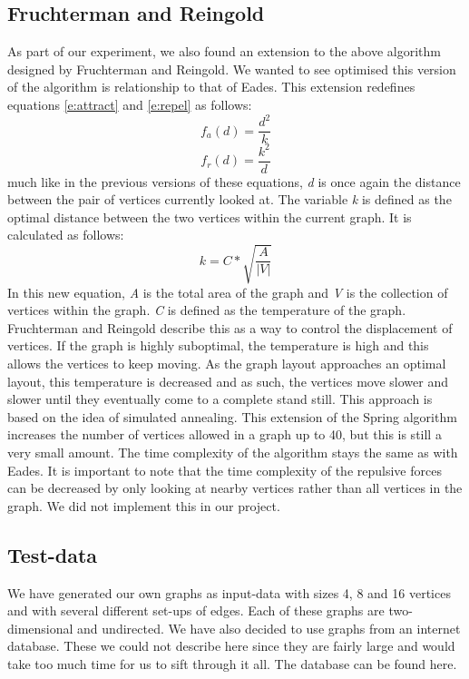 \documentclass[a4paper,12pt]{article}
\begin{document}
\subsection{Fruchterman and Reingold}
As part of our experiment, we also found an extension to the above algorithm designed by Fruchterman and Reingold\cite{FandR}. We wanted to see optimised this version of the algorithm is relationship to that of Eades. This extension redefines equations \ref{e:attract} and \ref{e:repel} as follows:
\begin{equation}\label{e:FRattract}
f_a(d)=\frac{d^2}{k}
\end{equation}
\begin{equation}\label{e:FRrepel}
f_r(d)=\frac{k^2}{d}
\end{equation}
much like in the previous versions of these equations, \emph{d} is once again the distance between the pair of vertices currently looked at. The variable \emph{k} is defined as the optimal distance between the two vertices within the current graph. It is calculated as follows:
\begin{equation}\label{e:optimalD}
k=C*\sqrt{\frac{A}{|V|}}
\end{equation}
In this new equation, \emph{A} is the total area of the graph and \emph{V} is the collection of vertices within the graph. \emph{C} is defined as the temperature of the graph. Fruchterman and Reingold describe this as a way to control the displacement of vertices. If the graph is highly suboptimal, the temperature is high and this allows the vertices to keep moving. As the graph layout approaches an optimal layout, this temperature is decreased and as such, the vertices move slower and slower until they eventually come to a complete stand still. This approach is based on the idea of simulated annealing.
\newline
This extension of the Spring algorithm increases the number of vertices allowed in a graph up to 40, but this is still a very small amount. The time complexity of the algorithm stays the same as with Eades. It is important to note that the time complexity of the repulsive forces can be decreased by only looking at nearby vertices rather than all vertices in the graph. We did not implement this in our project.
\subsection{Test-data}
We have generated our own graphs as input-data with sizes 4, 8 and 16 vertices and with several different set-ups of edges. Each of these graphs are two-dimensional and undirected. We have also decided to use graphs from an internet database. These we could not describe here since they are fairly large and would take too much time for us to sift through it all. The database can be found here\cite{Database}.
\end{document}
